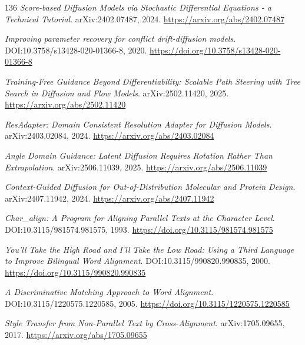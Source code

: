 \documentclass[11pt,a4paper]{article}
\begin{document}
\begin{thebibliography}{136}
\newblock \emph{Score-based Diffusion Models via Stochastic Differential Equations - a Technical Tutorial}.
\newblock arXiv:2402.07487, 2024.
\newblock \url{https://arxiv.org/abs/2402.07487}

\newblock \emph{Improving parameter recovery for conflict drift-diffusion models}.
\newblock DOI:10.3758/s13428-020-01366-8, 2020.
\newblock \url{https://doi.org/10.3758/s13428-020-01366-8}

\newblock \emph{Training-Free Guidance Beyond Differentiability: Scalable Path Steering with Tree Search in Diffusion and Flow Models}.
\newblock arXiv:2502.11420, 2025.
\newblock \url{https://arxiv.org/abs/2502.11420}

\newblock \emph{ResAdapter: Domain Consistent Resolution Adapter for Diffusion Models}.
\newblock arXiv:2403.02084, 2024.
\newblock \url{https://arxiv.org/abs/2403.02084}

\newblock \emph{Angle Domain Guidance: Latent Diffusion Requires Rotation Rather Than Extrapolation}.
\newblock arXiv:2506.11039, 2025.
\newblock \url{https://arxiv.org/abs/2506.11039}

\newblock \emph{Context-Guided Diffusion for Out-of-Distribution Molecular and Protein Design}.
\newblock arXiv:2407.11942, 2024.
\newblock \url{https://arxiv.org/abs/2407.11942}

\newblock \emph{Char\_align: A Program for Aligning Parallel Texts at the Character Level}.
\newblock DOI:10.3115/981574.981575, 1993.
\newblock \url{https://doi.org/10.3115/981574.981575}

\newblock \emph{You'll Take the High Road and I'll Take the Low Road: Using a Third Language to Improve Bilingual Word Alignment}.
\newblock DOI:10.3115/990820.990835, 2000.
\newblock \url{https://doi.org/10.3115/990820.990835}

\newblock \emph{A Discriminative Matching Approach to Word Alignment}.
\newblock DOI:10.3115/1220575.1220585, 2005.
\newblock \url{https://doi.org/10.3115/1220575.1220585}

\newblock \emph{Style Transfer from Non-Parallel Text by Cross-Alignment}.
\newblock arXiv:1705.09655, 2017.
\newblock \url{https://arxiv.org/abs/1705.09655}


\end{thebibliography}
\end{document}
